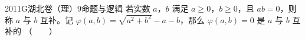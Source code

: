 
\begin{problem}{2011}{G}{湖北卷（理）}{9}{命题与逻辑}
若实数 $a$，$b$ 满足 $a\geq0$，$b\geq0$，且 $ab=0$，则称 $a$ 与 $b$ 互补。记 $\varphi(a,b)=\sqrt{a^2+b^2}-a-b$，那么 $\varphi(a,b)=0$ 是 $a$ 与 $b$ 互补的 \hspace{1cm}（　　）
\begin{choices}
\end{choices}
\end{problem}

\begin{answer}

\end{answer}

\begin{solutions}

\end{solutions}